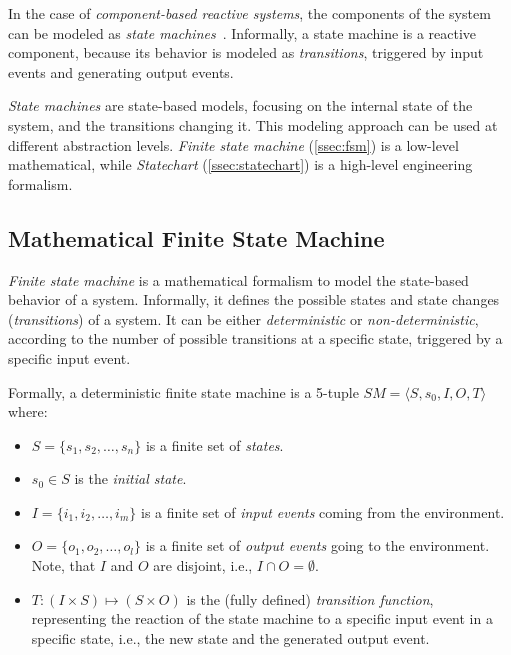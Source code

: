 In the case of \textit{component-based reactive systems}, the components of the system can be modeled as \textit{state machines}~\cite{Gamma}. Informally, a state machine is a reactive component, because its behavior is modeled as \textit{transitions}, triggered by input events and generating output events.

\textit{State machines} are state-based models, focusing on the internal state of the system, and the transitions changing it. This modeling approach can be used at different abstraction levels. \textit{Finite state machine} (\autoref{ssec:fsm}) is a low-level mathematical, while \textit{Statechart} (\autoref{ssec:statechart}) is a high-level engineering formalism.

\subsection{Mathematical Finite State Machine}\label{ssec:fsm}

\textit{Finite state machine} is a mathematical formalism to model the state-based behavior of a system. Informally, it defines the possible states and state changes (\textit{transitions}) of a system. It can be either \textit{deterministic} or \textit{non-deterministic}, according to the number of possible transitions at a specific state, triggered by a specific input event.

\begin{definition}\label{def:fsm}
    Formally, a deterministic finite state machine is a 5-tuple $SM = \langle S, s_0, I, O, T \rangle$ where:
    \begin{itemize}
        \item $S = \{ s_1, s_2, \ldots, s_n  \}$ is a finite set of \textit{states}.
        \item $s_0 \in S$ is the \textit{initial state}.
        \item $I = \{ i_1, i_2, \ldots, i_m \}$ is a finite set of \textit{input events} coming from the environment.
        \item $O = \{ o_1, o_2, \ldots, o_l \}$ is a finite set of \textit{output events} going to the environment. Note, that $I$ and $O$ are disjoint, i.e., $I \cap O = \emptyset$.
        \item $T: (I \times S) \mapsto (S \times O)$ is the (fully defined) \textit{transition function}, representing the reaction of the state machine to a specific input event in a specific state, i.e., the new state and the generated output event.
    \end{itemize}
\end{definition}

